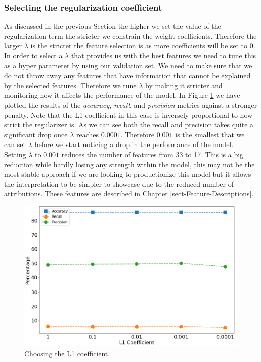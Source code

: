 \subsubsection{Selecting the regularization coefficient}
As discussed in the previous Section the higher we set the value of the regularization term the stricter we constrain the weight coefficients. Therefore the larger $\lambda$ is the stricter the feature selection is as more coefficients will be set to 0. In order to select a $\lambda$ that provides us with the best features we need to tune this as a hyper parameter by using our validation set. We need to make sure that we do not throw away any features that have information that cannot be explained by the selected features. Therefore we tune $\lambda$ by making it stricter and monitoring how it affects the performance of the model. In Figure \ref{fig-regularizer} we have plotted the results of the \emph{accuracy}, \emph{recall}, and \emph{precision} metrics against a stronger penalty. Note that the L1 coefficient in this case is inversely proportional to how strict the regularizer is. As we can see both the recall and precision takes quite a significant drop once $\lambda$ reaches $0.0001$. Therefore $0.001$ is the smallest that we can set $\lambda$ before we start noticing a drop in the performance of the model. Setting $\lambda$ to $0.001$ reduces the number of features from 33 to 17. This is a big reduction while hardly losing any strength within the model, this may not be the most stable approach if we are looking to productionize this model but it allows the interpretation to be simpler to showcase due to the reduced number of attributions. These features are described in Chapter \ref{sect-Feature-Descriptions}.
\begin  {figure}[!htpb]
\centering
  \includegraphics[width=\linewidth]{Credit_Images/Regularizer.png}
   \caption{Choosing the L1 coefficient.}
    \label{fig-regularizer}
\end{figure}

